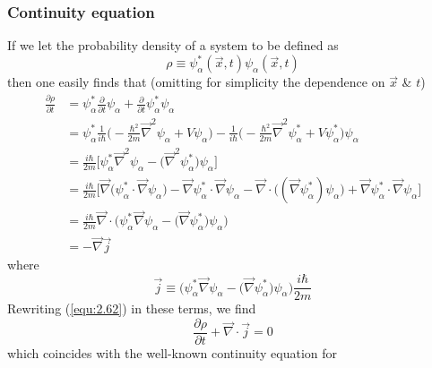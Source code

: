 \subsubsection{Continuity equation}
If we let the probability density of a system to be defined
as
\begin{equation}
  \rho \equiv \psi^*_{\alpha}(\vec{x},t)
  \psi_{\alpha}(\vec{x},t)
  \label{equ:2.61}
\end{equation}
then one easily finds that (omitting for simplicity the
dependence on $\vec{x}$ \& $t$)
\begin{align}
  \frac{\partial \rho}{\partial t} &= \psi_{\alpha}^*
  \frac{\partial}{\partial t} \psi_{\alpha} +
  \frac{\partial}{\partial t} \psi_{\alpha}^* \psi_{\alpha}
  \nonumber \\
  &=
  \psi_{\alpha}^* \frac{1}{i\hbar}
  \biggl(-\frac{\hbar^2}{2m}\vec{\nabla}^2 \psi_{\alpha} +
  V\psi_{\alpha}\biggr) - 
  \frac{1}{i\hbar} \biggl(-\frac{\hbar^2}{2m}\vec{\nabla}^2
  \psi_{\alpha}^* + V\psi_{\alpha}^* \biggr) \psi_{\alpha}
  \nonumber \\
  &=
  \frac{i\hbar}{2m} \biggl[\psi_{\alpha}^* \vec{\nabla}^2
  \psi_{\alpha}-\bigl(\vec{\nabla}^2
\psi_{\alpha}^*\bigr)\psi_{\alpha}\biggr] \nonumber \\
&=
\frac{i\hbar}{2m}
\biggl[
  \vec{\nabla}\bigl(\psi_{\alpha}^*\cdot
  \vec{\nabla}\psi_{\alpha}\bigr)-
  \vec{\nabla}\psi_{\alpha}^* \cdot
  \vec{\nabla}\psi_{\alpha} -
  \vec{\nabla}\cdot\bigl((\vec{\nabla}\psi_{\alpha}^*)\psi_{\alpha}\bigr)
  +
  \vec{\nabla}\psi_{\alpha}^* \cdot \vec{\nabla}\psi_{\alpha}
\biggr]\nonumber \\
&=
\frac{i\hbar}{2m} \vec{\nabla}\cdot \biggl(\psi_{\alpha}^* 
\vec{\nabla}\psi_{\alpha} -
\bigl(\vec{\nabla}\psi_{\alpha}^*\bigr)\psi_{\alpha}
\biggr) \nonumber\\
&=
- \vec{\nabla} \vec{j} \label{equ:2.62}
\end{align}
where
\begin{equation}
  \vec{j}\equiv
\biggl(\psi_{\alpha}^* 
\vec{\nabla}\psi_{\alpha} -
\bigl(\vec{\nabla}\psi_{\alpha}^*\bigr)\psi_{\alpha}
\biggr) \frac{i\hbar}{2m}
  \label{equ:2.63}
\end{equation}
Rewriting (\ref{equ:2.62}) in these terms, we find
\begin{equation}
  \frac{\partial \rho}{\partial t} + \vec{\nabla}\cdot
  \vec{j} = 0
  \label{equ:2.64}
\end{equation}
which coincides with the well-known continuity equation for
